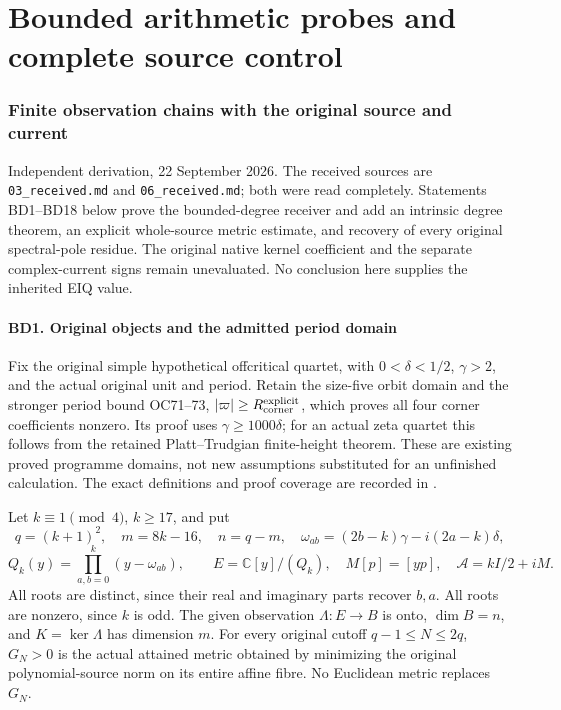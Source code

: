 \documentclass[11pt]{article}
\begin{document}
\clearpage\part{Bounded arithmetic probes and complete source control}
\section{Finite observation chains with the original source and current}\label{finite-observation-chains-with-the-original-source-and-current}

Independent derivation, 22 September 2026. The received sources are \texttt{03\_received.md} and \texttt{06\_received.md}; both were read completely. Statements BD1--BD18 below prove the bounded-degree receiver and add an intrinsic degree theorem, an explicit whole-source metric estimate, and recovery of every original spectral-pole residue. The original native kernel coefficient and the separate complex-current signs remain unevaluated. No conclusion here supplies the inherited EIQ value.

\subsection{BD1. Original objects and the admitted period domain}\label{bd1.-original-objects-and-the-admitted-period-domain}

Fix the original simple hypothetical offcritical quartet, with \(0<\delta<1/2\), \(\gamma>2\), and the actual original unit and period. Retain the size-five orbit domain and the stronger period bound OC71--73, \(|\varpi|\ge R_{\rm corner}^{\rm explicit}\), which proves all four corner coefficients nonzero. Its proof uses \(\gamma\ge1000\delta\); for an actual zeta quartet this follows from the retained Platt--Trudgian finite-height theorem. These are existing proved programme domains, not new assumptions substituted for an unfinished calculation. The exact definitions and proof coverage are recorded in \texttt{}.

Let \(k\equiv1\pmod4\), \(k\ge17\), and put \[
q=(k+1)^2,\quad m=8k-16,\quad n=q-m,\quad
\omega_{ab}=(2b-k)\gamma-i(2a-k)\delta,
\] \[
Q_k(y)=\prod_{a,b=0}^k(y-\omega_{ab}),\qquad
E=\mathbb C[y]/(Q_k),\quad M[p]=[yp],\quad
\mathscr A=kI/2+iM.
\] All roots are distinct, since their real and imaginary parts recover \(b,a\). All roots are nonzero, since \(k\) is odd. The given observation \(\Lambda:E\to B\) is onto, \(\dim B=n\), and \(K=\ker\Lambda\) has dimension \(m\). For every original cutoff \(q-1\le N\le2q\), \(G_N>0\) is the actual attained metric obtained by minimizing the original polynomial-source norm on its entire affine fibre. No Euclidean metric replaces \(G_N\).
\end{document}
